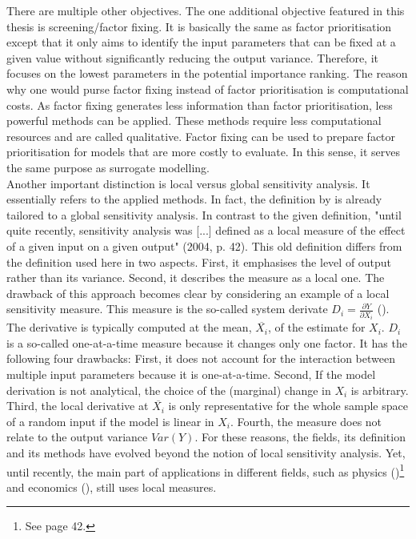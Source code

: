 \documentclass[a4paper,12pt]{article}
\begin{document}
There are multiple other objectives. The one additional objective featured in this thesis is screening/factor fixing. It is basically the same as factor prioritisation except that it only aims to identify the input parameters that can be fixed at a given value without significantly reducing the output variance. Therefore, it focuses on the lowest parameters in the potential importance ranking. The reason why one would purse factor fixing instead of factor prioritisation is computational costs. As factor fixing generates less information than factor prioritisation, less powerful methods can be applied. These methods require less computational resources and are called qualitative. Factor fixing can be used to prepare factor prioritisation for models that are more costly to evaluate. In this sense, it serves the same purpose as surrogate modelling.\\

\noindent
Another important distinction is local versus global sensitivity analysis. It essentially refers to the applied methods. In fact, the definition by \cite{Saltelli.2004} is already tailored to a global sensitivity analysis. In contrast to the given definition, "until quite recently, sensitivity analysis was [...] defined as a local measure of the effect of a given input on a given output" \citeauthor{Saltelli.2004} (2004, p. 42). This old definition differs from the definition used here in two aspects. First, it emphasises the level of output rather than its variance. Second, it describes the measure as a local one. The drawback of this approach becomes clear by considering an example of a local sensitivity measure. This measure is the so-called system derivate $D_i = \frac{\partial Y}{\partial X_i}$ (\cite{rabitz1989systems}). The derivative is typically computed at the mean, $\overline{X_i}$, of the estimate for $X_i$. $D_i$ is a so-called one-at-a-time measure because it changes only one factor. It has the following four drawbacks: First, it does not account for the interaction between multiple input parameters because it is one-at-a-time. Second, If the model derivation is not analytical, the choice of the (marginal) change in $X_i$ is arbitrary. Third, the local derivative at $\overline{X_i}$ is only representative for the whole sample space of a random input if the model is linear in $X_i$. Fourth, the measure does not relate to the output variance $Var(Y)$. For these reasons, the fields, its definition and its methods have evolved beyond the notion of local sensitivity analysis. Yet, until recently, the main part of applications in different fields, such as physics (\cite{Saltelli.2004})\footnote{See page 42.} and economics (\cite{Harenberg.2019}), still uses local measures.
\end{document}
